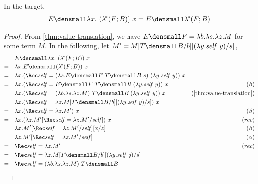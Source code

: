 \begin{lemma}[$\eta\lamstar$]
  \label{thm:eta-lamstar}
  In the target,
  \begin{align*}
   E\den{\lambda x.~ (\lamstar (F; B)) ~ x} = E\den{\lamstar (F; B)} 
  \end{align*}
\end{lemma}
\begin{proof}
  From \cref{thm:value-translation}, we have
  $E\den{F} = \lambda b.\lambda s. \lambda z. M$ for some term $M$.  In the
  following, let
  $M' = M\subst{b}{T\den{B}}\subst{s}{(\lambda y.\mathit{self}~y)}$,
  \begin{align*}
    &\quad
    E\den{\lambda x.~ (\lamstar (F; B)) ~ x}
    \\
    =&\quad
    \lambda x. E\den{(\lamstar (F; B))} ~ x
    \\
    =&\quad
    \lambda x.
    (\Rec \mathit{self}
    = (\lambda s. E\den{F} ~ T\den{B} ~ s)
    ~ (\lambda y. \mathit{self}~y))
    ~ x
    \\
    =&\quad
    \lambda x.
    (\Rec \mathit{self} = E\den{F} ~ T\den{B} ~ (\lambda y. \mathit{self}~y))
    ~ x
    &(\beta)
    \\
    =&\quad
    \lambda x.
    (\Rec \mathit{self}
    = (\lambda b.\lambda s.\lambda z. M) ~ T\den{B}
    ~ (\lambda y. \mathit{self}~y))
    ~ x
    &(\cref{thm:value-translation})
    \\
    =&\quad
    \lambda x.
    (\Rec \mathit{self}
    = \lambda z. M\subst{b}{T\den{B}}\subst{s}{(\lambda y.\mathit{self}~y)})
    ~ x
    \\
    =&\quad
    \lambda x.
    (\Rec \mathit{self} = \lambda z. M')
    ~ x
    &(\beta)
    \\
    =&\quad
    \lambda x.
    (\lambda z.
    M'
    \subst{\mathit{self}}{\Rec \mathit{self} = \lambda z. M'})
    ~ x
    &(rec)
    \\
    =&\quad
    \lambda x.
    M'
    \subst{\mathit{self}}{\Rec \mathit{self} = \lambda z. M'}
    \subst{z}{x}
    &(\beta)
    \\
    =&\quad
    \lambda z.
    M'
    \subst{\mathit{self}}{\Rec \mathit{self} = \lambda z. M'}
    &(\alpha)
    \\
    =&\quad
    \Rec \mathit{self} = \lambda z. M'
    &(rec)
    \\
    =&\quad
    \Rec \mathit{self}
    = \lambda z. M\subst{b}{T\den{B}}\subst{s}{(\lambda y.\mathit{self}~y)}
    \\
    =&\quad
    \Rec \mathit{self}
    = (\lambda b. \lambda s. \lambda z. M) ~ T\den{B}

\end{align*}
\end{proof}
